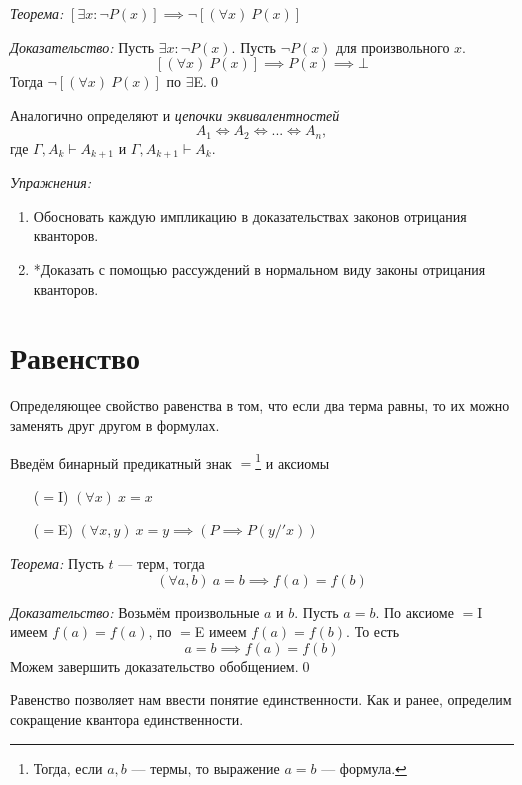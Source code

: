 \vspace{1em}
{\it Теорема:} $[\exists x:\lnot P(x)]\implies\lnot[(\forall x)~P(x)]$

{\it Доказательство:}
Пусть $\exists x:\lnot P(x)$. Пусть $\lnot P(x)$ для произвольного $x$.
\[
  [(\forall x)~P(x)]\implies P(x)\implies \bot
\]
Тогда $\lnot[(\forall x)~P(x)]$ по $\exists$E.\qed

\vspace{1em}
Аналогично определяют и {\it цепочки эквивалентностей}
\[
  A_1\iff A_2\iff ...\iff A_{n},
\]
где $\Gamma,A_{k}\vdash A_{k+1}$ и $\Gamma,A_{k+1}\vdash A_{k}$.

\vspace{1em}
{\it Упражнения:}
\begin{enumerate}
  \item{}Обосновать каждую импликацию в доказательствах законов отрицания кванторов.
  \item{}*Доказать с помощью рассуждений в нормальном виду законы отрицания кванторов.
\end{enumerate}

\section{Равенство}

Определяющее свойство равенства в том, что если два терма равны, то их можно
заменять друг другом в формулах.

Введём бинарный предикатный знак $=$\footnote{
  Тогда, если $a,b$	 --- термы, то выражение $a=b$ --- формула.}
и аксиомы
\begin{enumerate}
  \item[($=$I)]{}$(\forall x)~x=x$
  \item[($=$E)]{}$(\forall x,y)~x=y\implies (P\implies P(y/'x))$
\end{enumerate}

\vspace{1em}
{\it Теорема:} Пусть $t$ --- терм, тогда
\[
  (\forall a,b)~a=b\implies f(a)=f(b)
\]

{\it Доказательство:}
Возьмём произвольные $a$ и $b$. Пусть $a=b$.
По аксиоме $=$I имеем $f(a)=f(a)$, по $=$E имеем $f(a)=f(b)$.
То есть
\[
  a=b\implies f(a)=f(b)
\]
Можем завершить доказательство обобщением.\qed


Равенство позволяет нам ввести понятие единственности.
Как и ранее, определим сокращение квантора единственности.


